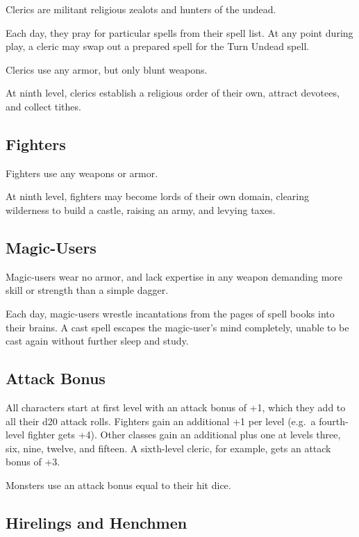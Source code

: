 Clerics are militant religious zealots and hunters of the undead.

Each day, they pray for particular spells from their spell list. At any
point during play, a cleric may swap out a prepared spell for the Turn
Undead spell.

Clerics use any armor, but only blunt weapons.

At ninth level, clerics establish a religious order of their own,
attract devotees, and collect tithes.

\subsection{Fighters}\label{fighters}

Fighters use any weapons or armor.

At ninth level, fighters may become lords of their own domain, clearing
wilderness to build a castle, raising an army, and levying taxes.

\subsection{Magic-Users}\label{magic-users}

Magic-users wear no armor, and lack expertise in any weapon demanding
more skill or strength than a simple dagger.

Each day, magic-users wrestle incantations from the pages of spell books
into their brains. A cast spell escapes the magic-user's mind
completely, unable to be cast again without further sleep and study.

\subsection{Attack Bonus}\label{attack-bonus}

All characters start at first level with an attack bonus of +1, which
they add to all their d20 attack rolls. Fighters gain an additional +1
per level (e.g.~a fourth-level fighter gets +4). Other classes gain an
additional plus one at levels three, six, nine, twelve, and fifteen. A
sixth-level cleric, for example, gets an attack bonus of +3.

Monsters use an attack bonus equal to their hit dice.

\subsection{Hirelings and Henchmen}\label{hirelings-and-henchmen}

